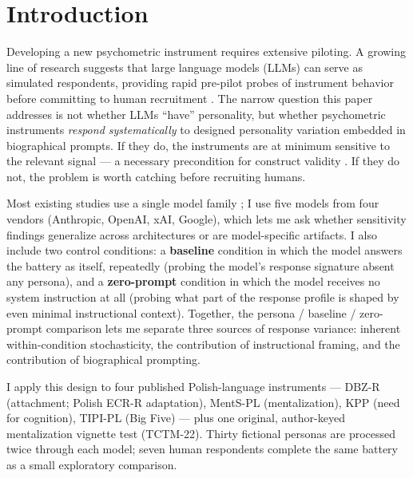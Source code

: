 \documentclass[11pt,a4paper]{article}
\begin{document}
\begin{abstract}
Open data, biographies, and analysis scripts are released under CC BY 4.0; every numeric claim in this paper is reproducible from the released CSV.

\vspace{4pt}\noindent\textbf{Keywords:} synthetic respondents, instrument sensitivity, mentalization, attachment, cross-vendor LLM comparison, baseline response signature
\end{abstract}

\section{Introduction}

Developing a new psychometric instrument requires extensive piloting. A growing line of research suggests that large language models (LLMs) can serve as simulated respondents, providing rapid pre-pilot probes of instrument behavior before committing to human recruitment \cite{argyle2023,dillion2023}. The narrow question this paper addresses is not whether LLMs ``have'' personality, but whether psychometric instruments \emph{respond systematically} to designed personality variation embedded in biographical prompts. If they do, the instruments are at minimum sensitive to the relevant signal --- a necessary precondition for construct validity \cite{cronbach1955}. If they do not, the problem is worth catching before recruiting humans.

Most existing studies use a single model family \cite{argyle2023,dillion2023}; I use five models from four vendors (Anthropic, OpenAI, xAI, Google), which lets me ask whether sensitivity findings generalize across architectures or are model-specific artifacts. I also include two control conditions: a \textbf{baseline} condition in which the model answers the battery as itself, repeatedly (probing the model's response signature absent any persona), and a \textbf{zero-prompt} condition in which the model receives no system instruction at all (probing what part of the response profile is shaped by even minimal instructional context). Together, the persona / baseline / zero-prompt comparison lets me separate three sources of response variance: inherent within-condition stochasticity, the contribution of instructional framing, and the contribution of biographical prompting.

I apply this design to four published Polish-language instruments --- DBZ-R (attachment; Polish ECR-R adaptation), MentS-PL (mentalization), KPP (need for cognition), TIPI-PL (Big Five) --- plus one original, author-keyed mentalization vignette test (TCTM-22). Thirty fictional personas are processed twice through each model; seven human respondents complete the same battery as a small exploratory comparison.
\end{document}
